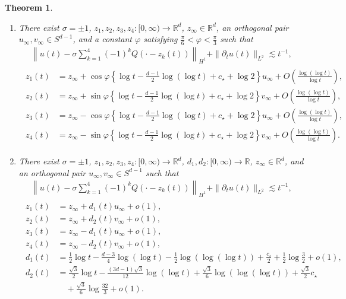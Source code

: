\documentclass[10pt,a4paper]{amsart}
\newtheorem{theorem}{Theorem}[section]
\numberwithin{equation}{section}
\begin{document}
\begin{theorem}
\begin{enumerate}
\item There exist $\sigma=\pm 1$, $z_1,z_2,z_3,z_4:[0,\infty)\to\mathbb{R}^d$, $z_{\infty}\in\mathbb{R}^d$, an orthogonal pair $u_{\infty},v_{\infty}\in S^{d-1}$, and a constant $\varphi$ satisfying $\frac{\pi}{6}<\varphi<\frac{\pi}{3}$ such that
\begin{align}\label{4rhombustheorem1}
\left\| u(t)-\sigma \sum_{k=1}^4 (-1)^kQ(\cdot-z_k(t))\right\|_{H^1}+\|{\partial}_tu(t)\|_{L^2}\lesssim t^{-1},
\end{align}
\begin{align}\label{4rhombustheorem2}
\begin{aligned}
z_1(t)&=z_{\infty}+\cos{\varphi}\left\{\log{t}-\frac{d-1}{2}\log{(\log{t})}+c_{\star}+\log{2} \right\}u_{\infty}+O\left(\frac{\log{(\log{t})}}{\log{t}}\right),
\\
z_2(t)&=z_{\infty}+\sin{\varphi}\left\{\log{t}-\frac{d-1}{2}\log{(\log{t})}+c_{\star}+\log{2} \right\}v_{\infty}+O\left(\frac{\log{(\log{t})}}{\log{t}}\right),
\\
z_3(t)&=z_{\infty}-\cos{\varphi}\left\{\log{t}-\frac{d-1}{2}\log{(\log{t})}+c_{\star}+\log{2} \right\}u_{\infty}+O\left(\frac{\log{(\log{t})}}{\log{t}}\right),
\\
z_4(t)&=z_{\infty}-\sin{\varphi}\left\{\log{t}-\frac{d-1}{2}\log{(\log{t})}+c_{\star}+\log{2} \right\}v_{\infty}+O\left(\frac{\log{(\log{t})}}{\log{t}}\right).
\end{aligned}
\end{align}

\item There exist $\sigma=\pm 1$, $z_1,z_2,z_3,z_4:[0,\infty)\to\mathbb{R}^d$, $d_1,d_2:[0,\infty)\to\mathbb{R}$, $z_{\infty}\in\mathbb{R}^d$, and an orthogonal pair $u_{\infty},v_{\infty}\in S^{d-1}$ such that
\begin{align}\label{4rhombustheorem3}
\left\| u(t)-\sigma \sum_{k=1}^4 (-1)^kQ(\cdot-z_k(t))\right\|_{H^1}+\|{\partial}_tu(t)\|_{L^2}\lesssim t^{-1},
\end{align}
\begin{align}\label{4rhombustheorem4}
\begin{aligned}
z_1(t)&=z_{\infty}+d_1(t)u_{\infty}+o(1),
\\
z_2(t)&=z_{\infty}+d_2(t)v_{\infty}+o(1),
\\
z_3(t)&=z_{\infty}-d_1(t)u_{\infty}+o(1),
\\
z_4(t)&=z_{\infty}-d_2(t)v_{\infty}+o(1),
\\
d_1(t)&=\frac{1}{2}\log{t}-\frac{d-3}{4}\log{(\log{t})}-\frac{1}{2}\log{(\log{(\log{t})})}+\frac{c_{\star}}{2}+\frac{1}{2}\log{\frac{3}{2}}+o(1),
\\
d_2(t)&=\frac{\sqrt{3}}{2}\log{t}-\frac{(3d-1)\sqrt{3}}{12}\log{(\log{t})}+\frac{\sqrt{3}}{6}\log{(\log{(\log{t})})}+\frac{\sqrt{3}}{2}c_{\star}
\\
&\quad+\frac{\sqrt{3}}{6}\log{\frac{32}{3}}+o(1).
\end{aligned}
\end{align}

\end{enumerate}
\end{theorem}
\end{document}

